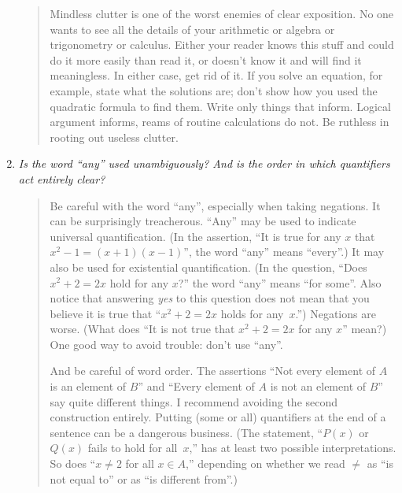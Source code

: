 \begin{enumerate}
     \begin{quote}
Mindless clutter is one of the worst enemies of clear exposition.  No one wants to see all the
details of your arithmetic or algebra or trigonometry or calculus.  Either your reader knows
this stuff and could do it more easily than read it, or doesn't know it and will find it
meaningless.  In either case, get rid of it.  If you solve an equation, for example, state
what the solutions are; don't show how you used the quadratic formula to find them.  Write
only things that inform.  Logical argument informs, reams of routine calculations do not.  Be
ruthless in rooting out useless clutter.
     \end{quote}

\vspace{15pt}

   \item \emph{Is the word ``any'' used unambiguously?  And is the order in which quantifiers
act entirely clear?}

\vspace{10pt}

     \begin{quote}
Be careful with the word ``any'', especially when taking negations.  It can be surprisingly
treacherous.  ``Any'' may be used to indicate universal quantification.  (In the assertion,
``It is true for any $x$ that $x^2 - 1 = (x + 1)(x - 1)$'', the word ``any'' means ``every''.)
It may also be used for existential quantification.  (In the question, ``Does $x^2 + 2 = 2x$
hold for any $x$?'' the word ``any'' means ``for some''.  Also notice that answering
\emph{yes} to this question does not mean that you believe it is true that ``$x^2 + 2 = 2x$
holds for any~$x$.'') Negations are worse.  (What does ``It is not true that $x^2 + 2 = 2x$
for any $x$'' mean?)   One good way to avoid trouble: don't use ``any''.

\vspace{5pt}

And be careful of word order.  The assertions ``Not every element of $A$ is an element of
$B$'' and ``Every element of $A$ is not an element of $B$'' say quite different things.  I
recommend avoiding the second construction entirely.  Putting (some or all) quantifiers at the
end of a sentence can be a dangerous business. (The statement, ``$P(x)$ or $Q(x)$ fails to
hold for all~$x$,'' has at least two possible interpretations. So does ``$x \neq 2$ for all $x
\in A$,'' depending on whether we read $\neq$ as ``is not equal to'' or as ``is different
from''.)
     \end{quote}
 \end{enumerate}



